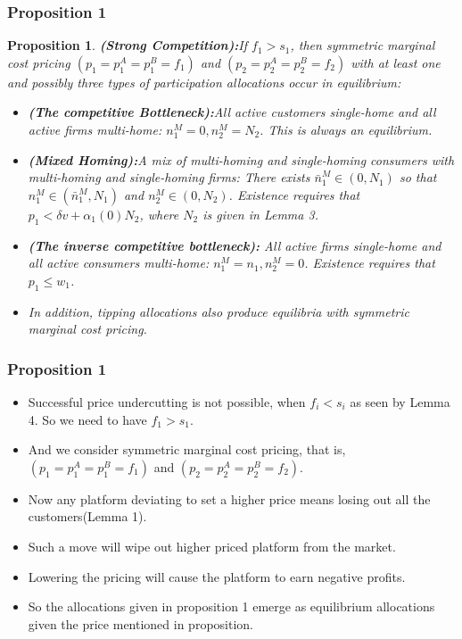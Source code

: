 \documentclass[11pt]{beamer}
\theoremstyle{boldstyle}
\newtheorem{proposition}[theorem]{Proposition}
\begin{document}
\begin{frame}
	\frametitle{Proposition 1}
	\begin{small}
\begin{proposition}
	\textbf{(Strong Competition):}If $f_1>s_1$, then symmetric marginal cost pricing $(p_1=p_1^A=p_1^B=f_1)$ and $(p_2=p_2^A=p_2^B=f_2)$ with at least one and possibly three types of participation allocations occur in equilibrium:
	\begin{itemize}
		\item \textbf{(The competitive Bottleneck):}All active customers single-home and all active firms multi-home: $n_1^M=0, n_2^M=N_2$. This is always an equilibrium. 
		\item \textbf{(Mixed Homing):}A mix of multi-homing and single-homing consumers with multi-homing and single-homing firms: There exists $\bar{n}_1^M \in (0,N_1)$ so that ${n}_1^M \in (\bar{n}_1^M, N_1)$ and $n_2^M \in (0,N_2)$. Existence requires that $p_1<\delta v +\alpha_1(0)N_2$, where $N_2$ is given in Lemma 3.
		\item \textbf{(The inverse competitive bottleneck):} All active firms single-home and all active consumers multi-home: $n_1^M=n_1, n_2^M=0$. Existence requires that $p_1 \leq w_1$.
		\item In addition, tipping allocations also produce equilibria with symmetric marginal cost pricing.
	\end{itemize}
\end{proposition}
	\end{small}
\end{frame}

\begin{frame}
	\frametitle{Proposition 1}
	\begin{small}

			\begin{itemize}
				\item Successful price undercutting is not possible, when $f_i<s_i$ as seen by Lemma 4. So we need to have $f_1>s_1$. 
				\item And we consider symmetric marginal cost pricing, that is, $(p_1=p_1^A=p_1^B=f_1)$ and $(p_2=p_2^A=p_2^B=f_2)$. 
				\item Now any platform deviating to set a higher price means losing out all the customers(Lemma 1). 
				\item Such a move will wipe out higher priced platform from the market.
				\item  Lowering the pricing will cause the platform to earn negative profits. 
				\item So the allocations given in proposition 1 emerge as equilibrium allocations given the price mentioned in proposition. 
			\end{itemize}

	\end{small}
\end{frame}
\end{document}
